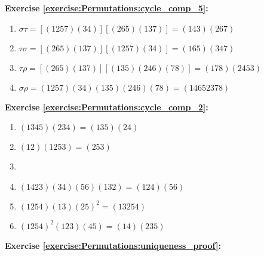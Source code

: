 \noindent\textbf{Exercise \ref{exercise:Permutations:cycle_comp_5}:}
%
%
\begin{enumerate}[{a.}]
\item
$\sigma\tau = [(1257)(34)][(265)(137)] = (143)(267)$

\item
$\tau \sigma = [(265)(137)][(1257)(34)] = (165)(347)$

\item
$\tau \rho = [(265)(137)][(135)(246)(78)] = (178)(2453)$

\item
$\sigma \rho = (1257)(34)(135)(246)(78) = (14652378)$
\end{enumerate}

\noindent\textbf{Exercise \ref{exercise:Permutations:cycle_comp_2}:} %
\begin{enumerate}[{a.}]
\item
$(1345)(234) = (135)(24)$

\item
$(12)(1253) = (253)$

\item

\item
$(1423)(34)(56)(132) = (124)(56)$

\item
$(1254)(13)(25)^2 = (13254)$ 

\item
$(1254)^2(123)(45) = (14)(235)$ 
\end{enumerate}

\noindent\textbf{Exercise \ref{exercise:Permutations:uniqueness_proof}:}\\

